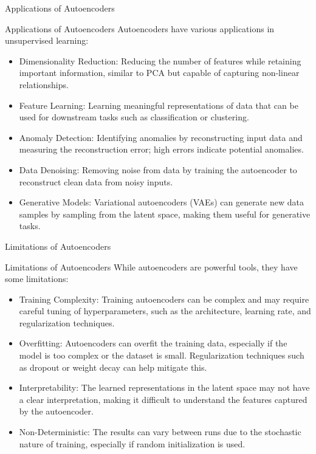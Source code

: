 \documentclass[hyperref={pdfpagelabels=false},aspectratio=169]{beamer}
\begin{document}
\begin{frame}[label={sec:org8cf3ca3}]{Applications of Autoencoders}
\begin{block}{Applications of Autoencoders}
\pause
Autoencoders have various applications in unsupervised learning:
\begin{itemize}[<+->]
\item \alert{\alert{Dimensionality Reduction}}: Reducing the number of features while retaining important information, similar to PCA but capable of capturing non-linear relationships.
\item \alert{\alert{Feature Learning}}: Learning meaningful representations of data that can be used for downstream tasks such as classification or clustering.
\item \alert{\alert{Anomaly Detection}}: Identifying anomalies by reconstructing input data and measuring the reconstruction error; high errors indicate potential anomalies.
\item \alert{\alert{Data Denoising}}: Removing noise from data by training the autoencoder to reconstruct clean data from noisy inputs.
\item \alert{\alert{Generative Models}}: Variational autoencoders (VAEs) can generate new data samples by sampling from the latent space, making them useful for generative tasks.
\end{itemize}
\end{block}
\end{frame}
\begin{frame}[label={sec:orga87f901}]{Limitations of Autoencoders}
\begin{block}{Limitations of Autoencoders}
\pause
While autoencoders are powerful tools, they have some limitations:
\begin{itemize}[<+->]
\item \alert{\alert{Training Complexity}}: Training autoencoders can be complex and may require careful tuning of hyperparameters, such as the architecture, learning rate, and regularization techniques.
\item \alert{\alert{Overfitting}}: Autoencoders can overfit the training data, especially if the model is too complex or the dataset is small. Regularization techniques such as dropout or weight decay can help mitigate this.
\item \alert{\alert{Interpretability}}: The learned representations in the latent space may not have a clear interpretation, making it difficult to understand the features captured by the autoencoder.
\item \alert{\alert{Non-Deterministic}}: The results can vary between runs due to the stochastic nature of training, especially if random initialization is used.
\end{itemize}
\end{block}
\end{frame}
\end{document}
